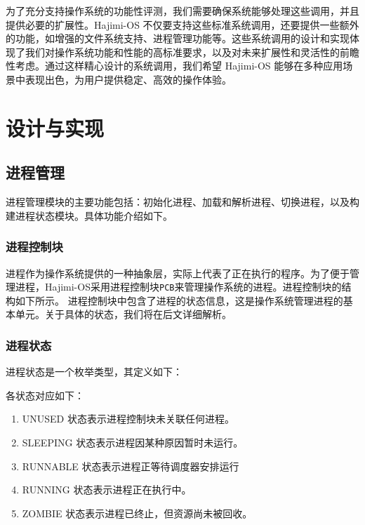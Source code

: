 \documentclass[UTF8]{article}
\begin{document}
为了充分支持操作系统的功能性评测，我们需要确保系统能够处理这些调用，并且提供必要的扩展性。Hajimi-OS 不仅要支持这些标准系统调用，还要提供一些额外的功能，如增强的文件系统支持、进程管理功能等。这些系统调用的设计和实现体现了我们对操作系统功能和性能的高标准要求，以及对未来扩展性和灵活性的前瞻性考虑。通过这样精心设计的系统调用，我们希望 Hajimi-OS 能够在多种应用场景中表现出色，为用户提供稳定、高效的操作体验。

\section{设计与实现}
\subsection{进程管理}
进程管理模块的主要功能包括：初始化进程、加载和解析进程、切换进程，以及构建进程状态模块。具体功能介绍如下。
\subsubsection{进程控制块}
进程作为操作系统提供的一种抽象层，实际上代表了正在执行的程序。为了便于管理进程，Hajimi-OS采用进程控制块\texttt{PCB}来管理操作系统的进程。进程控制块的结构如下所示。
进程控制块中包含了进程的状态信息，这是操作系统管理进程的基本单元。关于具体的状态，我们将在后文详细解析。

\subsubsection{进程状态}
进程状态是一个枚举类型，其定义如下：

各状态对应如下：
\begin{enumerate}[label=\textbf{\arabic*}., wide, labelwidth=!, labelindent=0pt]
  \item UNUSED 状态表示进程控制块未关联任何进程。
  \item SLEEPING 状态表示进程因某种原因暂时未运行。
  \item RUNNABLE 状态表示进程正等待调度器安排运行
  \item RUNNING 状态表示进程正在执行中。
  \item ZOMBIE 状态表示进程已终止，但资源尚未被回收。
\end{enumerate}
\end{document}
